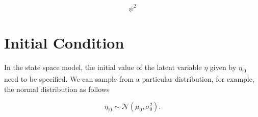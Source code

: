 \documentclass{article}
\begin{document}
\begin{equation}
    \psi^{2}
\end{equation}

\section{Initial Condition}

In the state space model, the initial value of the latent variable $\eta$ given by $\eta_{\mid 0}$ need to be specified. We can sample from a particular distribution, for example, the normal distribution as follows

\begin{equation}
    \eta_{\mid 0} \sim \mathcal{N} \left( \mu_{0}, \sigma^{2}_{0} \right) .
\end{equation}
\end{document}
